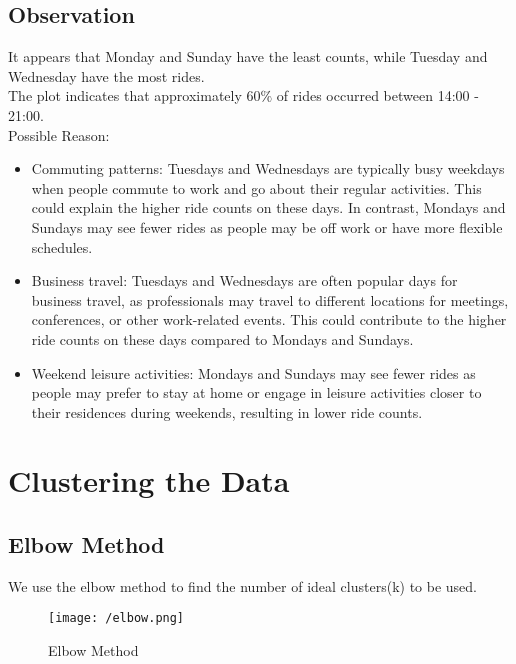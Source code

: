 \documentclass[fleqn]{report}
\begin{document}
	\subsection{Observation}
	It appears that Monday and Sunday have the least counts, while Tuesday and Wednesday have the most rides.\\
	The plot indicates that approximately 60$\%$ of rides occurred between 14:00 - 21:00.\\
	Possible Reason:
	\begin{itemize}
		\item Commuting patterns: Tuesdays and Wednesdays are typically busy weekdays when people commute to work and go about their regular activities. This could explain the higher ride counts on these days. In contrast, Mondays and Sundays may see fewer rides as people may be off work or have more flexible schedules.
		\item Business travel: Tuesdays and Wednesdays are often popular days for business travel, as professionals may travel to different locations for meetings, conferences, or other work-related events. This could contribute to the higher ride counts on these days compared to Mondays and Sundays.
		\item Weekend leisure activities: Mondays and Sundays may see fewer rides as people may prefer to stay at home or engage in leisure activities closer to their residences during weekends, resulting in lower ride counts.
	\end{itemize}
	\section{Clustering the Data}
	\subsection{Elbow Method}
	We use the elbow method to find the number of ideal clusters(k) to be used.
	\begin{figure}[!ht]
		\centering
		\texttt{[image: /elbow.png]}
		\caption{Elbow Method}
		\label{fig:elbow}
	\end{figure}
\end{document}
